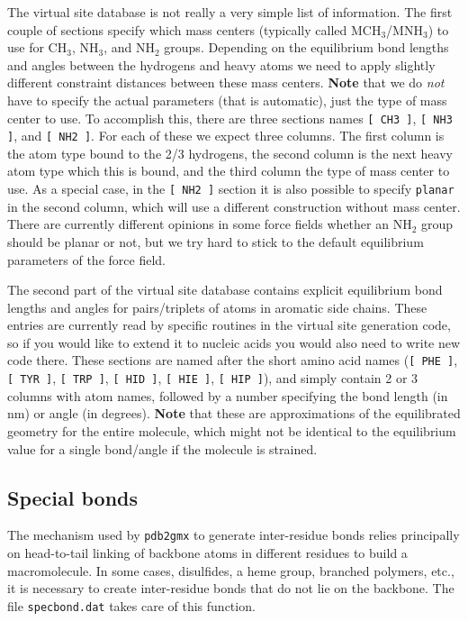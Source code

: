 The virtual site database is not really a very simple list of information. The first couple of sections
specify which mass centers (typically called MCH$_3$/MNH$_3$) to use for CH$_3$, NH$_3$, 
and NH$_2$ groups. Depending on the 
equilibrium bond lengths and angles between the hydrogens and heavy atoms we need to apply
slightly different constraint distances between these mass centers. {\bf Note} that we do {\em not} have to
specify the actual parameters (that is automatic), just the type of mass center to use. To accomplish this,
there are three sections names \verb+[ CH3 ]+, \verb+[ NH3 ]+, and \verb+[ NH2 ]+. For each of these we
expect three columns. The first column is the atom type bound to the 2/3 hydrogens, the second column
is the next heavy atom type which this is bound, and the third column the type of mass center to use.
As a special case, in the  \verb+[ NH2 ]+ section it is also possible to specify \verb+planar+ in the second
column, which will use a different construction without mass center. There are currently different opinions
in some force fields whether an NH$_2$ group should be planar or not, but we try hard to stick to the
default equilibrium parameters of the force field.

The second part of the virtual site database contains explicit equilibrium bond lengths and angles
for pairs/triplets of atoms in aromatic side chains. These entries are currently read by specific routines
in the virtual site generation code, so if you would like to extend it {\eg} to nucleic acids you would also
need to write new code there. These sections are named after the short amino acid names
(\verb+[ PHE ]+, \verb+[ TYR ]+, \verb+[ TRP ]+, \verb+[ HID ]+, \verb+[ HIE ]+, \verb+[ HIP ]+), and simply
contain 2 or 3 columns with atom names, followed by a number specifying the bond length (in nm) or angle
(in degrees). {\bf Note} that these are approximations of the equilibrated geometry for the entire molecule, 
which might not be identical to the equilibrium value for a single bond/angle if the molecule is strained.

\subsection{Special bonds}
\label{subsec:specbond}
The mechanism used by {\tt pdb2gmx} to generate inter-residue bonds relies principally on head-to-tail linking
of backbone atoms in different residues to build a macromolecule. In some cases, {\eg} disulfides, a heme group, branched polymers, etc., it is 
necessary to create inter-residue bonds that do not lie on the backbone.  The file {\tt specbond.dat} takes care of this function.

